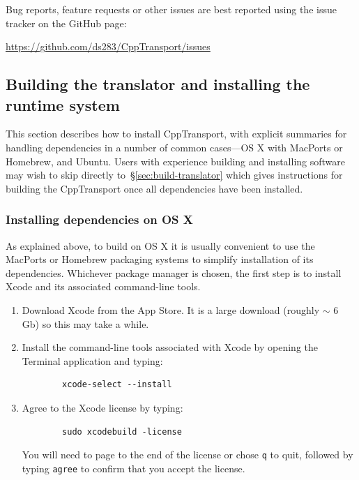 \documentclass[11pt,a4paper]{article}
\newcommand{\packagefont}{\sffamily}
\newcommand{\CppTransport}{{\packagefont CppTransport}}
\newcommand{\Xcode}{{\packagefont Xcode}}
\newcommand{\MacPorts}{{\packagefont MacPorts}}
\newcommand{\Homebrew}{{\packagefont Homebrew}}
\newcommand{\semibold}[1]{{\fontseries{b}\selectfont{#1}}}
\newcommand{\para}[1]{\par\vspace{2mm}\noindent\semibold{{#1.}---}\ignorespaces}
\begin{document}
\para{Reporting issues}
Bug reports, feature requests or other issues are best reported
using the issue tracker on the GitHub page:
\begin{center}
    \url{https://github.com/ds283/CppTransport/issues}    
\end{center}


\subsection{Building the translator and installing the runtime system}
\label{sec:build-install}

This section describes how to install {\CppTransport},
with explicit summaries for handling dependencies in a number of
common cases---OS X with {\MacPorts} or {\Homebrew}, and Ubuntu.
Users with experience building and installing software may wish
to skip directly to~\S\ref{sec:build-translator}
which gives instructions for building the {\CppTransport}
once all dependencies have been installed.

\subsubsection{Installing dependencies on OS X}

As explained above, to build on OS X it is usually convenient to use
the {\MacPorts} or {\Homebrew} packaging systems to simplify installation
of its dependencies.
Whichever package manager is chosen, the first step is to install
{\Xcode} and its associated command-line tools.
\begin{enumerate}
    \item Download {\Xcode} from the App Store. It is a large download
    (roughly $\sim$ 6 Gb) so this may take a while.
    
    \item Install the command-line tools associated with {\Xcode}
    by opening the Terminal application and typing:
    \begin{verbatim}
        xcode-select --install    
    \end{verbatim}
    
    \item Agree to the {\Xcode} license by typing:
    \begin{verbatim}
        sudo xcodebuild -license    
    \end{verbatim}
    You will need to page to the end of the license or chose
    \texttt{q} to quit, followed by typing
    \texttt{agree} to confirm that you accept the license.
\end{enumerate}
\end{document}
